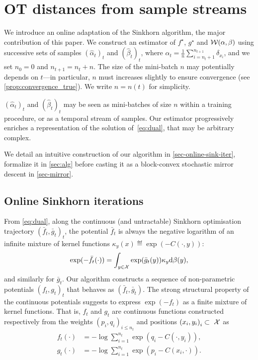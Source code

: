 
\section{OT distances from sample streams}

We introduce an online adaptation of the Sinkhorn algorithm, the major
contribution of this paper. We construct an estimator of $f^\star$, $g^\star$
and $\mathcal{W}(\alpha,\beta)$ using successive sets of samples ${(\hat \alpha_t)}_t$
and ${(\hat \beta_t)}_t$, where $\alpha_t = \frac{1}{n} \sum_{i=n_t +
1}^{n_{t+1}} \delta_{x_i}$, and we set  $n_0 = 0$ and $n_{t+1} = n_{t} +
n$. The size of the mini-batch $n$ may potentially depends on $t$---in
particular, $n$ must increases slightly to ensure convergence (see
\autoref{prop:convergence_true}). We write $n = n(t)$ for simplicity.

${(\hat \alpha_t)}_t$ and ${(\hat \beta_t)}_t$ may be
seen as mini-batches of size $n$ within a training procedure, or as a temporal
stream of samples.
%
Our estimator progressively enriches a representation of the
solution of~\eqref{eq:dual}, that may be arbitrary complex. 

We detail an intuitive construction of our algorithm in
\autoref{sec-online-sink-iter}, formalize it in \autoref{sec:alg} before casting
it as a block-convex stochastic mirror descent in \ref{sec-mirror}.


\subsection{Online Sinkhorn iterations}
\label{sec-online-sink-iter}

From \eqref{eq:dual}, along the continuous (and untractable) Sinkhorn
optimisation trajectory ${(\bar f_t, \bar g_t)}_t$, the potential $\bar f_t$ is
always the negative logarithm of an infinite mixture of kernel functions
$\kappa_y(x) \eqdef \exp(-C(\cdot, y))$:
\begin{equation*}
    \exp(-\bar f_t(\cdot)) = 
    \int_{y \in \mathcal{X}} \exp(\bar g_t(y))  \kappa_y  \textrm{d} \beta(y),
\end{equation*}
and similarly for $\bar g_t$. Our algorithm constructs a sequence of non-parametric
potentials $(f_t, g_t)_t$ that behaves as $(\bar f_t, \bar g_t)$. The strong
structural property of the continuous potentials suggests to express
$\exp(-f_t)$ as a finite mixture of kernel functions. That is, $f_t$ and $g_t$
are continuous functions constructed respectively from the weights ${(p_i,
q_i)}_{i \leq n_t}$ and positions ${(x_i, y_i)}_{i} \subset~\mathcal{X}$ as
\begin{align}\label{eq:param}
    f_t(\cdot) &= - \log \sum_{i=1}^{n_t} 
    \exp(q_i - C(\cdot, y_i)),  \\
    g_t(\cdot) &= - \log \sum_{i=1}^{n_t}
    \exp(p_i - C(x_i, \cdot)).
\end{align}
